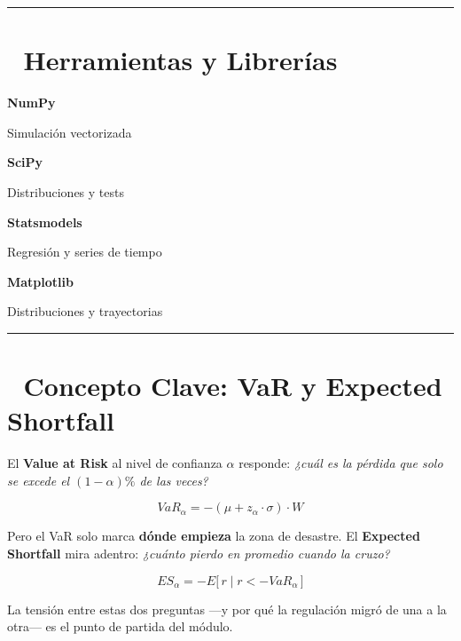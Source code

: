 \documentclass[
  spanish,
  letterpaper,
  DIV=11,
  numbers=noendperiod]{scrreprt}
\begin{document}
\begin{center}\rule{0.5\linewidth}{0.5pt}\end{center}

\section*{🧰 Herramientas y
Librerías}\label{herramientas-y-libreruxedas-2}


\textbf{NumPy}

Simulación vectorizada

\textbf{SciPy}

Distribuciones y tests

\textbf{Statsmodels}

Regresión y series de tiempo

\textbf{Matplotlib}

Distribuciones y trayectorias

\begin{center}\rule{0.5\linewidth}{0.5pt}\end{center}

\section*{🔑 Concepto Clave: VaR y Expected
Shortfall}\label{concepto-clave-var-y-expected-shortfall}


\begin{tcolorbox}[enhanced jigsaw, bottomrule=.15mm, colback=white, breakable, left=2mm, colframe=quarto-callout-important-color-frame, leftrule=.75mm, arc=.35mm, toprule=.15mm, rightrule=.15mm, opacityback=0]
\begin{minipage}[t]{5.5mm}
\textcolor{quarto-callout-important-color}{\faExclamation}
\end{minipage}%
\begin{minipage}[t]{\textwidth - 5.5mm}

El \textbf{Value at Risk} al nivel de confianza \(\alpha\) responde:
\emph{¿cuál es la pérdida que solo se excede el \((1-\alpha)\%\) de las
veces?}

\[VaR_\alpha = -(\mu + z_\alpha \cdot \sigma) \cdot W\]

Pero el VaR solo marca \textbf{dónde empieza} la zona de desastre. El
\textbf{Expected Shortfall} mira adentro: \emph{¿cuánto pierdo en
promedio cuando la cruzo?}

\[ES_\alpha = -E\big[\,r \mid r < -VaR_\alpha\,\big]\]

La tensión entre estas dos preguntas ---y por qué la regulación migró de
una a la otra--- es el punto de partida del módulo.

\end{minipage}%
\end{tcolorbox}
\end{document}
